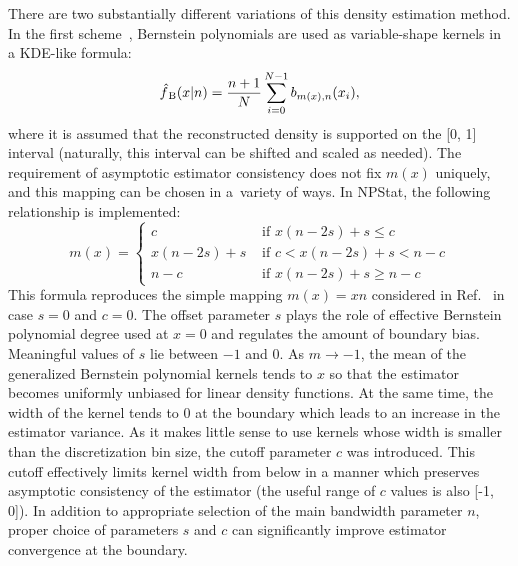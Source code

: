\documentclass[12pt,titlepage]{article}
\newcommand{\sub}[1]{\ensuremath{_{\mbox{\scriptsize \,#1}}}}
\begin{document}
There are two substantially different variations of this density estimation
method. In the first scheme~\cite{ref:betakern},
Bernstein polynomials are used
as variable-shape kernels in a KDE-like formula:
\begin{equation}
\hat{f}\sub{B}(x|n) = \frac{n + 1}{N} \sum_{i=0}^{N-1} b_{m(x), n}(x_i),
\label{eq:betakernels}
\end{equation}
where it is assumed
that the reconstructed density is supported on the [0, 1] interval
(naturally, this interval can be shifted and scaled as needed).
The requirement of asymptotic estimator consistency does not
fix $m(x)$ uniquely, and this mapping can be chosen in a~variety
of ways. In NPStat, the following relationship is implemented:
\begin{equation}
m(x) = \left\{ \begin{array}{ll}
                   c & \mbox{ if } x (n - 2 s) + s \leq c \\
                   x (n - 2 s) + s & \mbox{ if } c < x (n - 2 s) + s < n - c \\
                   n - c & \mbox{ if } x (n - 2 s) + s \geq n - c
               \end{array} \right.
\end{equation}
This formula reproduces the simple mapping $m(x) = x n$ considered in
Ref.~\cite{ref:betakern} in case $s = 0$ and $c = 0$. The offset parameter
$s$ plays the role of effective Bernstein polynomial degree used
at $x = 0$ and regulates the amount of boundary bias. Meaningful
values of $s$ lie between $-1$ and 0. As $m \rightarrow -1$, the mean
of the generalized Bernstein polynomial kernels tends to $x$ so that
the estimator
becomes uniformly unbiased for linear density functions.
At the same time, the width of
the kernel tends to 0 at the boundary which leads to an increase in the estimator
variance. As it makes little sense to use kernels whose width
is smaller than the discretization bin size, the cutoff parameter $c$
was introduced. This cutoff effectively limits kernel width from below
in a manner which preserves asymptotic consistency of the estimator
(the useful range of $c$ values is also [-1, 0]).
In addition to appropriate selection of the main
bandwidth parameter $n$, proper choice of parameters $s$ and $c$
can significantly improve estimator convergence at the boundary.
\end{document}
